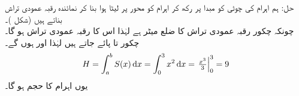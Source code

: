حل:\quad
{}\quad
{}\quad
ہم اہرام کی چوٹی کو مبدا پر رکھ کر اہرام کو  محور پر لیٹا ہوا بنا کر نمائندہ رقبہ عمودی تراش بناتے ہیں (شکل )۔\\
\quad
{}
\quad
چونکہ چکور رقبہ عمودی تراش کا ضلع  میٹر ہے لہٰذا اس کا رقبہ عمودی تراش  ہو گا۔\\
\quad
{}\quad
چکور  تا  پائے جاتے ہیں لہٰذا  اور  ہوں گے۔\\
\quad {}
\begin{align*}
H=\int_a^bS(x)\dif x=\int_0^3x^2\dif x=\left.\tfrac{x^3}{3}\right\vert_0^3=9
\end{align*}
یوں اہرام کا حجم  ہو گا۔
